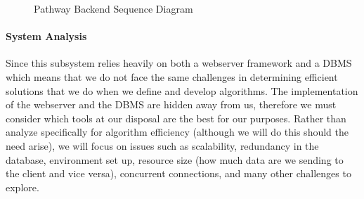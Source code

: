 ﻿\documentclass{article}
\begin{document}
\begin{figure}
    \centering
    \begin{center}
    \end{center}
    \caption{Pathway Backend Sequence Diagram}
    \label{fig:my_label}
\end{figure}

\paragraph{System Analysis}
Since this subsystem relies heavily on both a webserver framework and a DBMS which means that 
we do not face the same challenges in determining efficient solutions that we do when we define
and develop algorithms. The implementation of the webserver and the DBMS are hidden away from us, 
therefore we must consider which tools at our disposal are the best for our purposes. Rather
than analyze specifically for algorithm efficiency (although we will do this should the need
arise), we will focus on issues such as scalability, redundancy in the database, environment set up,
resource size (how much data are we sending to the client and vice versa), concurrent connections, and
many other challenges to explore. 
\end{document}
